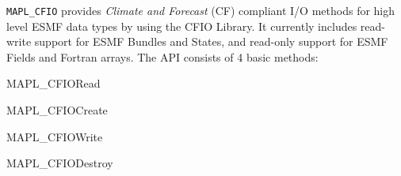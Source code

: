%  
%  
%  
%
%

      {\tt MAPL\_CFIO} provides {\em Climate and Forecast} (CF)
      compliant I/O methods for high level ESMF data types by using the
      CFIO Library. It currently includes read-write support for ESMF
      Bundles and States, and read-only support for ESMF Fields and
      Fortran arrays. The API consists of 4 basic methods:
\bi
      \item MAPL\_CFIORead
      \item MAPL\_CFIOCreate
      \item MAPL\_CFIOWrite
      \item MAPL\_CFIODestroy
\ei 

